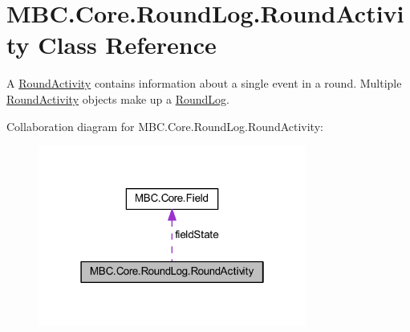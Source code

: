 \hypertarget{class_m_b_c_1_1_core_1_1_round_log_1_1_round_activity}{\section{M\-B\-C.\-Core.\-Round\-Log.\-Round\-Activity Class Reference}
\label{class_m_b_c_1_1_core_1_1_round_log_1_1_round_activity}
}


A \hyperlink{class_m_b_c_1_1_core_1_1_round_log_1_1_round_activity}{Round\-Activity} contains information about a single event in a round. Multiple \hyperlink{class_m_b_c_1_1_core_1_1_round_log_1_1_round_activity}{Round\-Activity} objects make up a \hyperlink{class_m_b_c_1_1_core_1_1_round_log}{Round\-Log}.  




Collaboration diagram for M\-B\-C.\-Core.\-Round\-Log.\-Round\-Activity\-:
\nopagebreak
\begin{figure}[H]
\begin{center}
\leavevmode
\includegraphics[width=250pt]{class_m_b_c_1_1_core_1_1_round_log_1_1_round_activity__coll__graph}
\end{center}
\end{figure}
